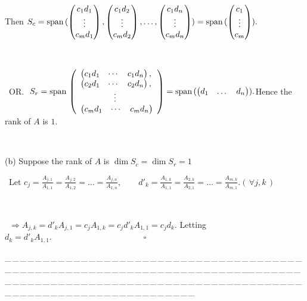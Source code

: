 \documentclass[a4paper, 11pt, UTF8]{article}
\def\Spn{\textup{span}\,}
\begin{document}
\begin{large}
Then $S_c=\Spn(\begin{pmatrix} c_1 d_1 \\ \vdots \\ c_m d_1\end{pmatrix},\begin{pmatrix} c_1 d_2 \\ \vdots \\ c_m d_2\end{pmatrix},\dots,\begin{pmatrix} c_1 d_n \\ \vdots \\ c_m d_n\end{pmatrix})=\Spn(\begin{pmatrix} c_1 \\ \vdots \\ c_m\end{pmatrix}).$\par\,\par\qquad\,
O{\small R.}\,\,\,\,$S_r=\Spn\left(\begin{array}{l}\begin{pmatrix} c_1 d_1 & \cdots & c_1 d_n\end{pmatrix},\\ \begin{pmatrix} c_2 d_1 & \cdots & c_2 d_n\end{pmatrix},\\ \qquad\qquad\vdots\\ \begin{pmatrix} c_m d_1 & \cdots & c_m d_n\end{pmatrix}\end{array}\right)=\Spn(\begin{pmatrix} d_1 & \dots & d_n\end{pmatrix}).$\qquad Hence the rank of $A$ is $1$.\par{\,}\par\quad
(b) Suppose the rank of $A$ is $\dim S_c=\dim S_r=1$ \par\qquad\,
Let $c_j=\displaystyle\frac{A_{j,1}}{A_{1,1}}=\frac{A_{j,2}}{A_{1,2}}=\dots=\frac{A_{j,n}}{A_{1,n}},\qquad d'_k=\frac{A_{1,k}}{A_{1,1}}=\frac{A_{2,k}}{A_{2,1}}=\dots=\frac{A_{m,k}}{A_{m,1}}$.\quad$(\,\forall j,k\,)$\par{\tiny{\,}\par}\qquad\,
$\Rightarrow A_{j,k}=d'_k A_{j,1}=c_j A_{1,k}=c_j d'_k A_{1,1}=c_j d_k.$ Letting $d_k=d'_k A_{1,1}.\qquad\qquad\qquad\qquad\qquad\quad\square$
\par
{\tiny \_\,\_\,\_\,\_\,\_\,\_\,\_\,\_\,\_\,\_\,\_\,\_\,\_\,\_\,\_\,\_\,\_\,\_\,\_\,\_\,\_\,\_\,\_\,\_\,\_\,\_\,\_\,\_\,\_\,\_\,\_\,\_\,\_\,\_\,\_\,\_\,\_\,\_\,\_\,\_\,\_\,\_\,\_\,\_\,\_\,\_\,\_\,\_\,\_\,\_\,\_\,\_\,\_\,\_\,\_\,\_\,\_\,\_\,\_\,\_\,\_\,\_\,\_\,\_\,\_\,\_\,\_\,\_\,\_\,\_\,\_\_\,\_\,\_\,\_\,\_\,\_\,\_\,\_\,\_\,\_\,\_\,\_\,\_\,\_\,\_\,\_\,\_\,\_\,\_\,\_\,\_\,\_\,\_\,\_\,\_\,\_\,\_\,\_\,\_\,\_\,\_\,\_\,\_\,\_\,\_\,\_\,\_\,\_\,\_\,\_\,\_\,\_\,\_\,\_\,\_\,\_\,\_\,\_\,\_\,\_\,\_\,\_\,\_\,\_\,\_\,\_\,\_\,\_\,\_\,\_\,\_\,\_\,\_\,\_\,\_\,\_\,\_\,\_\,\_\,\_\,\_}\par


\end{large}
\end{document}

